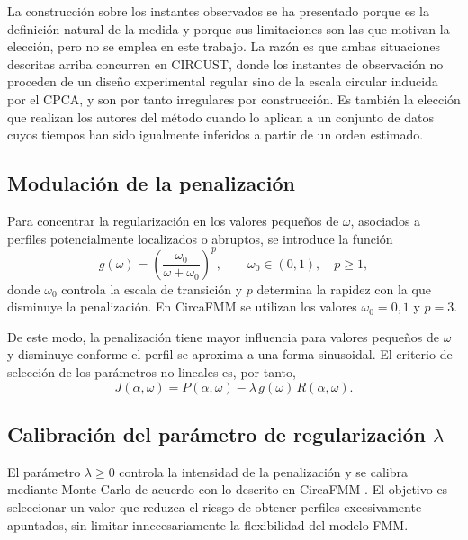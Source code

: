 \documentclass[12pt, a4paper]{report}
\begin{document}
La construcción sobre los instantes observados se ha presentado porque es la definición natural de la medida y porque sus limitaciones son las que motivan la elección, pero no se emplea en este trabajo. La razón es que ambas situaciones descritas arriba concurren en CIRCUST, donde los instantes de observación no proceden de un diseño experimental regular sino de la escala circular inducida por el CPCA, y son por tanto irregulares por construcción. Es también la elección que realizan los autores del método cuando lo aplican a un conjunto de datos cuyos tiempos han sido igualmente inferidos a partir de un orden estimado.

\subsection{Modulación de la penalización}

Para concentrar la regularización en los valores pequeños de \(\omega\), asociados a perfiles potencialmente localizados o abruptos, se introduce la función
\[
g(\omega)=\left(\frac{\omega_0}{\omega+\omega_0}\right)^p,\qquad \omega_0\in(0,1),\quad p\geq1,
\]
donde \(\omega_0\) controla la escala de transición y \(p\) determina la rapidez con la que disminuye la penalización. En CircaFMM se utilizan los valores \(\omega_0=0{,}1\) y \(p=3\).

De este modo, la penalización tiene mayor influencia para valores pequeños de \(\omega\) y disminuye conforme el perfil se aproxima a una forma sinusoidal. El criterio de selección de los parámetros no lineales es, por tanto,
\[
J(\alpha,\omega)=P(\alpha,\omega)-\lambda\,g(\omega)\,R(\alpha,\omega).
\]

\subsection{Calibración del parámetro de regularización \(\lambda\)}

El parámetro \(\lambda\geq 0\) controla la intensidad de la penalización y se calibra mediante Monte Carlo de acuerdo con lo descrito en CircaFMM \citep{Abston2026CircaFMM}. El objetivo es seleccionar un valor que reduzca el riesgo de obtener perfiles excesivamente apuntados, sin limitar innecesariamente la flexibilidad del modelo FMM.
\end{document}
